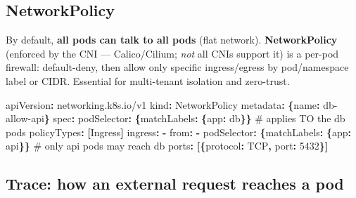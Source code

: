 \documentclass[11pt]{article}
\newenvironment{Shaded}{\begin{snugshade}}{\end{snugshade}}
\newcommand{\AttributeTok}[1]{\textcolor[rgb]{0.16,0.50,0.73}{#1}}
\newcommand{\CommentTok}[1]{\textcolor[rgb]{0.48,0.49,0.49}{#1}}
\newcommand{\DecValTok}[1]{\textcolor[rgb]{0.96,0.45,0.00}{#1}}
\newcommand{\FunctionTok}[1]{\textcolor[rgb]{0.56,0.27,0.68}{#1}}
\newcommand{\KeywordTok}[1]{\textcolor[rgb]{0.81,0.81,0.76}{\textbf{#1}}}
\begin{document}
\subsection{NetworkPolicy}\label{networkpolicy}

By default, \textbf{all pods can talk to all pods} (flat network). \textbf{NetworkPolicy} (enforced by the CNI --- Calico/Cilium; \emph{not} all CNIs support it) is a per-pod firewall: default-deny, then allow only specific ingress/egress by pod/namespace label or CIDR. Essential for multi-tenant isolation and zero-trust.


\begin{Shaded}
\begin{Highlighting}[]
\FunctionTok{apiVersion}\KeywordTok{:}\AttributeTok{ networking.k8s.io/v1}
\FunctionTok{kind}\KeywordTok{:}\AttributeTok{ NetworkPolicy}
\FunctionTok{metadata}\KeywordTok{:}\AttributeTok{ }\KeywordTok{\{}\FunctionTok{name}\KeywordTok{:}\AttributeTok{ db{-}allow{-}api}\KeywordTok{\}}
\FunctionTok{spec}\KeywordTok{:}
\AttributeTok{  }\FunctionTok{podSelector}\KeywordTok{:}\AttributeTok{ }\KeywordTok{\{}\FunctionTok{matchLabels}\KeywordTok{:}\AttributeTok{ }\KeywordTok{\{}\FunctionTok{app}\KeywordTok{:}\AttributeTok{ db}\KeywordTok{\}\}}\CommentTok{      \# applies TO the db pods}
\AttributeTok{  }\FunctionTok{policyTypes}\KeywordTok{:}\AttributeTok{ }\KeywordTok{[}\AttributeTok{Ingress}\KeywordTok{]}
\AttributeTok{  }\FunctionTok{ingress}\KeywordTok{:}
\AttributeTok{    }\KeywordTok{{-}}\AttributeTok{ }\FunctionTok{from}\KeywordTok{:}
\AttributeTok{        }\KeywordTok{{-}}\AttributeTok{ }\FunctionTok{podSelector}\KeywordTok{:}\AttributeTok{ }\KeywordTok{\{}\FunctionTok{matchLabels}\KeywordTok{:}\AttributeTok{ }\KeywordTok{\{}\FunctionTok{app}\KeywordTok{:}\AttributeTok{ api}\KeywordTok{\}\}}\CommentTok{   \# only api pods may reach db}
\AttributeTok{      }\FunctionTok{ports}\KeywordTok{:}\AttributeTok{ }\KeywordTok{[\{}\FunctionTok{protocol}\KeywordTok{:}\AttributeTok{ TCP}\KeywordTok{,}\AttributeTok{ }\FunctionTok{port}\KeywordTok{:}\AttributeTok{ }\DecValTok{5432}\KeywordTok{\}]}
\end{Highlighting}
\end{Shaded}

\subsection{Trace: how an external request reaches a pod}\label{trace-how-an-external-request-reaches-a-pod}
\end{document}
